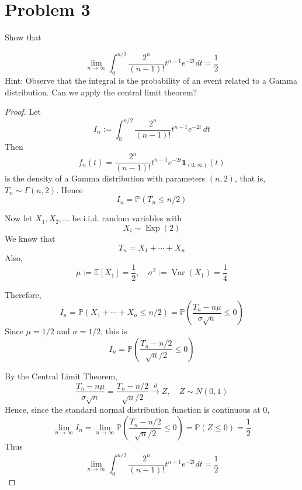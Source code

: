 \section*{Problem 3}
Show that

$$
\lim _{n \rightarrow \infty} \int_0^{n / 2} 
\frac{2^n}{(n-1)!} t^{n-1} e^{-2 t} dt
=\frac{1}{2}
$$
Hint: Observe that the integral is the probability of an event 
related to a Gamma distribution. Can we apply the central limit theorem?

\begin{proof}
Let
\[
I_n:=\int_0^{n/2}\frac{2^n}{(n-1)!}t^{n-1}e^{-2t}\,dt
\]
Then 
\[
f_n(t)=\frac{2^n}{(n-1)!}t^{n-1}e^{-2t}\mathbf{1}_{(0,\infty)}(t)
\]
is the density of a Gamma distribution with parameters $(n,2)$, that is,
\(
T_n\sim \Gamma(n,2)
\). 
Hence
\[
I_n=\mathbb{P}(T_n\le n/2)
\] 

Now let $X_1,X_2,\dots$ be i.i.d. random variables with
\[
X_i\sim \operatorname{Exp}(2)
\]
We know that 
\[
T_n=X_1+\cdots+X_n
\]
Also,
\[
\mu:=\mathbb{E}[X_1]=\frac12,
\quad
\sigma^2:=\operatorname{Var}(X_1)=\frac14
\]

Therefore,
\[
I_n=\mathbb{P}(X_1+\cdots+X_n\le n/2)
=
\mathbb{P}\!\left(\frac{T_n-n\mu}{\sigma\sqrt n}\le 0\right)
\]
Since $\mu=1/2$ and $\sigma=1/2$, this is
\[
I_n=\mathbb{P}\!\left(\frac{T_n-n/2}{\sqrt n/2}\le 0\right)
\]

By the Central Limit Theorem,
\[
\frac{T_n-n\mu}{\sigma\sqrt n}
=
\frac{T_n-n/2}{\sqrt n/2}
\xrightarrow{d} Z,
\quad Z\sim N(0,1)
\]
Hence, since the standard normal distribution function is continuous at $0$,
\[
\lim_{n\to\infty} I_n
=
\lim_{n\to\infty}
\mathbb{P}\!\left(\frac{T_n-n/2}{\sqrt n/2}\le 0\right)
=
\mathbb{P}(Z\le 0)
=
\frac12
\]
Thus
\[
\lim _{n \rightarrow \infty} \int_0^{n / 2}
\frac{2^n}{(n-1)!} t^{n-1} e^{-2 t} dt
=\frac{1}{2}
\]
\end{proof}





